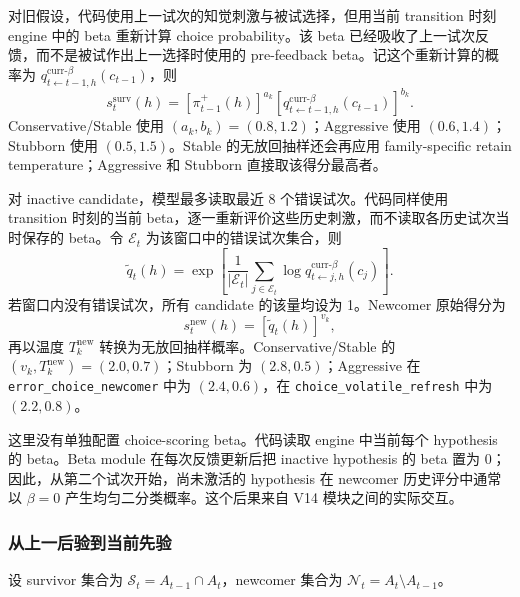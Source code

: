 对旧假设，代码使用上一试次的知觉刺激与被试选择，但用当前 transition 时刻 engine 中的 beta 重新计算 choice probability。该 beta 已经吸收了上一试次反馈，而不是被试作出上一选择时使用的 pre-feedback beta。记这个重新计算的概率为 $q_{t\leftarrow t-1,h}^{\mathrm{curr}\mbox{-}\beta}(c_{t-1})$，则
\begin{equation}
    s_t^{\mathrm{surv}}(h)
    =
    [\pi_{t-1}^{+}(h)]^{a_k}
    [q_{t\leftarrow t-1,h}^{\mathrm{curr}\mbox{-}\beta}(c_{t-1})]^{b_k}.
    \label{eq:modelv14-choice-survivor}
\end{equation}
Conservative/Stable 使用 $(a_k,b_k)=(0.8,1.2)$；Aggressive 使用 $(0.6,1.4)$；Stubborn 使用 $(0.5,1.5)$。Stable 的无放回抽样还会再应用 family-specific retain temperature；Aggressive 和 Stubborn 直接取该得分最高者。

对 inactive candidate，模型最多读取最近 8 个错误试次。代码同样使用 transition 时刻的当前 beta，逐一重新评价这些历史刺激，而不读取各历史试次当时保存的 beta。令 $\mathcal E_t$ 为该窗口中的错误试次集合，则
\begin{equation}
    \widetilde q_t(h)
    =
    \exp\left[
        \frac{1}{|\mathcal E_t|}
        \sum_{j\in\mathcal E_t}
        \log q_{t\leftarrow j,h}^{\mathrm{curr}\mbox{-}\beta}(c_j)
    \right].
    \label{eq:modelv14-choice-newcomer-base}
\end{equation}
若窗口内没有错误试次，所有 candidate 的该量均设为 1。Newcomer 原始得分为
\begin{equation}
    s_t^{\mathrm{new}}(h)
    =
    [\widetilde q_t(h)]^{v_k},
    \label{eq:modelv14-choice-newcomer-score}
\end{equation}
再以温度 $T_k^{\mathrm{new}}$ 转换为无放回抽样概率。Conservative/Stable 的 $(v_k,T_k^{\mathrm{new}})=(2.0,0.7)$；Stubborn 为 $(2.8,0.5)$；Aggressive 在 \texttt{error\_choice\_newcomer} 中为 $(2.4,0.6)$，在 \texttt{choice\_volatile\_refresh} 中为 $(2.2,0.8)$。

这里没有单独配置 choice-scoring beta。代码读取 engine 中当前每个 hypothesis 的 beta。Beta module 在每次反馈更新后把 inactive hypothesis 的 beta 置为 0；因此，从第二个试次开始，尚未激活的 hypothesis 在 newcomer 历史评分中通常以 $\beta=0$ 产生均匀二分类概率。这个后果来自 V14 模块之间的实际交互。


\subsubsection{从上一后验到当前先验}

设 survivor 集合为 $\mathcal S_t=A_{t-1}\cap A_t$，newcomer 集合为 $\mathcal N_t=A_t\setminus A_{t-1}$。

